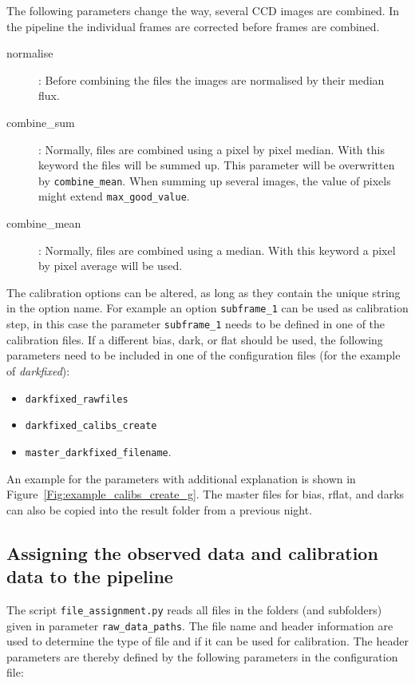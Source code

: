 \documentclass[10pt,a4paper]{article}
\begin{document}
\noindent The following parameters change the way, several CCD images are combined. In the pipeline the individual frames are corrected before frames are combined.
\begin{description}
  \item[normalise] : Before combining the files the images are normalised by their median flux.
  \item[combine\_sum] : Normally, files are combined using a pixel by pixel median. With this keyword the files will be summed up. This parameter will be overwritten by \verb|combine_mean|. When summing up several images, the value of pixels might extend \verb|max_good_value|.
  \item[combine\_mean] : Normally, files are combined using a median. With this keyword a pixel by pixel average will be used.
\end{description}

\noindent The calibration options can be altered, as long as they contain the unique string in the option name. For example an option \verb|subframe_1| can be used as calibration step, in this case the parameter \verb|subframe_1| needs to be defined in one of the calibration files. If a different bias, dark, or flat should be used, the following parameters need to be included in one of the configuration files (for the example of \textit{darkfixed}):
\begin{itemize}\setlength\itemsep{0em}
  \item \verb|darkfixed_rawfiles|
  \item \verb|darkfixed_calibs_create|
  \item \verb|master_darkfixed_filename|.
\end{itemize}

\noindent An example for the parameters with additional explanation is shown in Figure~\ref{Fig:example_calibs_create_g}. The master files for bias, rflat, and darks can also be copied into the result folder from a previous night.


\subsection{Assigning the observed data and calibration data to the pipeline}
\label{Section:prepare_files}

The script \verb|file_assignment.py| reads all files in the folders (and subfolders) given in parameter \verb|raw_data_paths|. The file name and header information are used to determine the type of file and if it can be used for calibration. The header parameters are thereby defined by the following parameters in the configuration file:
\end{document}
